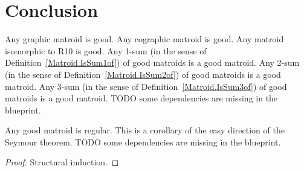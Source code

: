 \chapter{Conclusion}

\begin{definition}
    \label{Matroid.IsGood}
    \leanok
    Any graphic matroid is good.
    Any cographic matroid is good.
    Any matroid isomorphic to R10 is good.
    Any 1-sum (in the sense of Definition~\ref{Matroid.IsSum1of}) of good matroids is a good matroid.
    Any 2-sum (in the sense of Definition~\ref{Matroid.IsSum2of}) of good matroids is a good matroid.
    Any 3-sum (in the sense of Definition~\ref{Matroid.IsSum3of}) of good matroids is a good matroid.
    TODO some dependencies are missing in the blueprint.
\end{definition}

\begin{corollary}
    \label{Matroid.IsGood.isRegular}
    \leanok
    Any good matroid is regular. This is a corollary of the easy direction of the Seymour theorem.
    TODO some dependencies are missing in the blueprint.
\end{corollary}

\begin{proof}
    Structural induction.
\end{proof}
